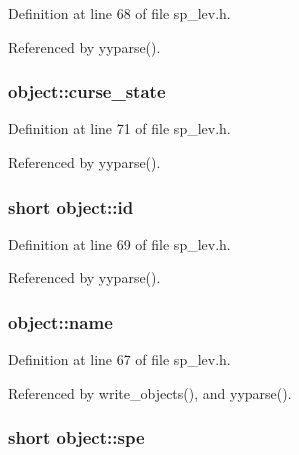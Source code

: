 Definition at line 68 of file sp\+\_\+lev.\+h.



Referenced by yyparse().

\hypertarget{structobject_a2a59500b53e0d54f2ee8b74139a984d5}{
\subsubsection[{curse\+\_\+state}]{ object\+::curse\+\_\+state}}\label{structobject_a2a59500b53e0d54f2ee8b74139a984d5}


Definition at line 71 of file sp\+\_\+lev.\+h.



Referenced by yyparse().

\hypertarget{structobject_a89b27835790711d028e57faf65818b57}{
\subsubsection[{id}]{\setlength{\rightskip}{0pt plus 5cm}short object\+::id}}\label{structobject_a89b27835790711d028e57faf65818b57}


Definition at line 69 of file sp\+\_\+lev.\+h.



Referenced by yyparse().

\hypertarget{structobject_acce2482cb9701001d8f378d3bfbdb8f6}{
\subsubsection[{name}]{ object\+::name}}\label{structobject_acce2482cb9701001d8f378d3bfbdb8f6}


Definition at line 67 of file sp\+\_\+lev.\+h.



Referenced by write\+\_\+objects(), and yyparse().

\hypertarget{structobject_ad788b20b1a3ad90f77344c4c6d7ecb09}{
\subsubsection[{spe}]{\setlength{\rightskip}{0pt plus 5cm}short object\+::spe}}\label{structobject_ad788b20b1a3ad90f77344c4c6d7ecb09}


